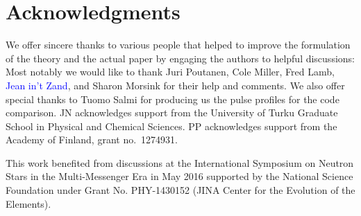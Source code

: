 \documentclass{aa}
\newcommand{\red}[1]{\textcolor{red}{#1}}
\newcommand{\refe}[1]{\textcolor{blue}{{#1}}}
\begin{document}
\section*{Acknowledgments}

\small{
We offer sincere thanks to various people that helped to improve the formulation of the theory and the actual paper by engaging the authors to helpful discussions: 
Most notably we would like to thank Juri Poutanen, Cole Miller, Fred Lamb, \refe{Jean in't Zand}, and Sharon Morsink for their help and comments.
We also offer special thanks to Tuomo Salmi for producing us the pulse profiles for the code comparison.
JN acknowledges support from the University of Turku Graduate School in Physical and Chemical Sciences.
PP acknowledges support from the Academy of Finland, grant no.~1274931.

This work benefited from discussions at the International Symposium on Neutron Stars in the Multi-Messenger Era in May 2016 supported by the National Science Foundation under Grant No. PHY-1430152 (JINA Center for the Evolution of the Elements).
}




\end{document}
